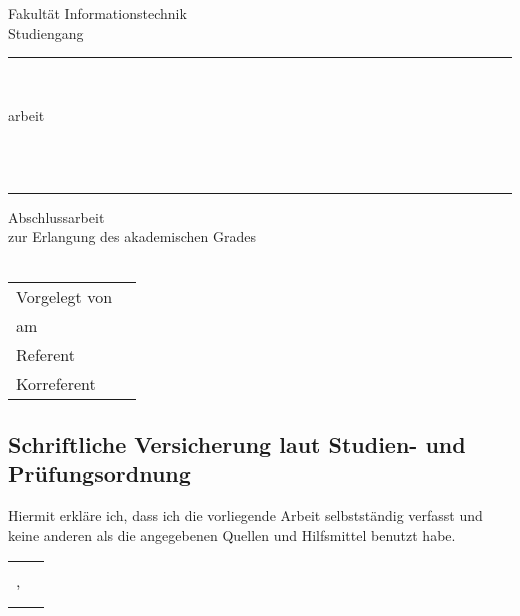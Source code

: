 \begin{titlepage}
  \hsmalogo[1] \hfill
  \parbox[b]{60mm}{
    Fakultät Informationstechnik\\
    Studiengang \studiengang}
  \begin{center}
    \rule{1\textwidth}{1pt}\\[-3mm]
    \parbox[t][64mm]{110mm}{%
      \begin{center}
        \Large{\welchethesis arbeit}\\[2mm]
        {\begin{spacing}{1.13} \huge \bfseries \titel \end{spacing}}
        \vfill
        \Large{\autor} \\[1mm] %
        \ 
      \end{center}
    }
    \rule{\textwidth}{1pt}    
    \vfill    
    {\Large Abschlussarbeit} \\[5mm]
    {\large zur Erlangung des akademischen Grades} \\[5mm]
    {\large \welchethesis\ \thesisofwas} \\[5mm]
    \vfill    
    \begin{tabular}{ll} %
      Vorgelegt von & \autor \\
      am & \datum \\
      Referent &  \\
      Korreferent & \korreferent
    \end{tabular}    
    \vfill
  \end{center}
\end{titlepage}
\cleardoublepage


\thispagestyle{empty}
\subsection*{Schriftliche Versicherung laut Studien- und Prüfungsordnung}

Hiermit erkläre ich, dass ich die vorliegende Arbeit selbstständig verfasst
und keine anderen als die angegebenen Quellen und Hilfsmittel benutzt habe.

\vspace{6em}
\noindent\begin{tabular}{p{}p{}}
\ort, \datum  & \rule{0.56\textwidth}{0.5pt}\\
              & \makebox[1cm]{\ } \autor
\end{tabular}

\vfill

\cleardoublepage

